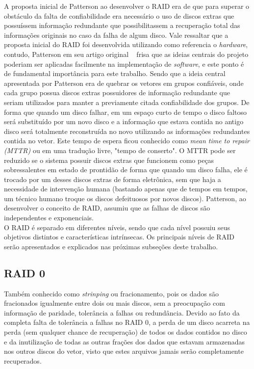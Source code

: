 A proposta inicial de Patterson ao desenvolver o RAID era de que para superar o obstáculo da falta de confiabilidade era necessário o uso de discos extras que possuíssem informação redundante que possibilitassem a recuperação total das informações originais no caso da falha de algum disco. Vale ressaltar que a proposta inicial do RAID foi desenvolvida utilizando como referencia o \textit{hardware}, contudo, Patterson em seu artigo original ~\cite{patterson88} frisa que as ideias centrais do projeto poderiam ser aplicadas facilmente na implementação de \textit{software}, e este ponto é de fundamental importância para este trabalho. Sendo que a ideia central apresentada por Patterson era de quebrar os vetores em grupos confiáveis, onde cada grupo possua discos extras possuidores de informação redundante que seriam utilizados para manter a previamente citada confiabilidade dos grupos. De forma que quando um disco falhar, em um espaço curto de tempo o disco faltoso será substituído por um novo disco e a informação que estava contida no antigo disco será totalmente reconstruída no novo utilizando as informações redundantes contida no vetor. Este tempo de espera ficou conhecido como \textit{mean time to repair (MTTR)} ou em uma tradução livre, "tempo de conserto". O MTTR pode ser reduzido se o sistema possuir discos extras que funcionem como peças sobressalentes em estado de prontidão de forma que quando um disco falha, ele é trocado por um desses discos extras de forma eletrônica, sem que haja a necessidade de intervenção humana (bastando apenas que de tempos em tempos, um técnico humano troque os discos defeituosos por novos discos). Patterson, ao desenvolver o conceito de RAID, assumiu que as falhas de discos são independentes e exponenciais. \\

O RAID é separado em diferentes níveis, sendo que cada nível possuiu seus objetivos distintos e características intrínsecas. Os principais níveis de RAID serão apresentados e explicados nas próximas subseções deste trabalho.
\\

\subsection{RAID 0}

Também conhecido como \textit{strinping} ou fracionamento, pois os dados são fracionados igualmente entre dois ou mais discos, sem a preocupação com informação de paridade, tolerância a falhas ou redundância. Devido ao fato da completa falta de tolerância a falhas no RAID 0, a perda de um disco acarreta na perda (sem qualquer chance de recuperação) de todos os dados contidos no disco e da inutilização de todas as outras frações dos dados que estavam armazenadas nos outros discos do vetor, visto que estes arquivos jamais serão completamente recuperados.
\\

